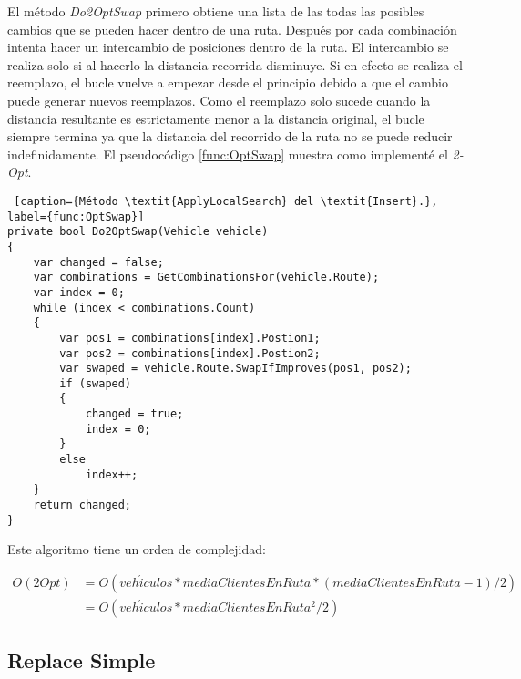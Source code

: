 \bigskip

El método \textit{Do2OptSwap} primero obtiene una lista de las todas las posibles cambios que se pueden hacer dentro de una ruta. Después por cada combinación intenta hacer un intercambio de posiciones dentro de la ruta. El intercambio se realiza solo si al hacerlo la distancia recorrida disminuye. Si en efecto se realiza el reemplazo, el bucle vuelve a empezar desde el principio debido a que el cambio puede generar nuevos reemplazos. Como el reemplazo solo sucede cuando la distancia resultante es estrictamente menor a la distancia original, el bucle siempre termina ya que la distancia del recorrido de la ruta no se puede reducir indefinidamente. El pseudocódigo \ref{func:OptSwap} muestra como implementé el \textit{2-Opt}.

\bigskip

\begin{minipage}{\textwidth}
\begin{lstlisting} [caption={Método \textit{ApplyLocalSearch} del \textit{Insert}.}, label={func:OptSwap}]
private bool Do2OptSwap(Vehicle vehicle)
{
	var changed = false;	
	var combinations = GetCombinationsFor(vehicle.Route);
	var index = 0;
	while (index < combinations.Count)
	{
		var pos1 = combinations[index].Postion1;
		var pos2 = combinations[index].Postion2;
		var swaped = vehicle.Route.SwapIfImproves(pos1, pos2);
		if (swaped)
		{
			changed = true;
			index = 0;
		}
		else
			index++;
	}
	return changed;
}
\end{lstlisting}
\end{minipage}


\begin{minipage}{\linewidth}
Este algoritmo tiene un orden de complejidad:

\begin{equation*}
\begin{split}
O(2Opt) &= O(veh\acute{i}culos * mediaClientesEnRuta  * (mediaClientesEnRuta - 1) / 2) \\
            &= O(veh\acute{i}culos * mediaClientesEnRuta^2 / 2)
\end{split}
\end{equation*}
\end{minipage}

\bigskip

\subsection{Replace Simple}

